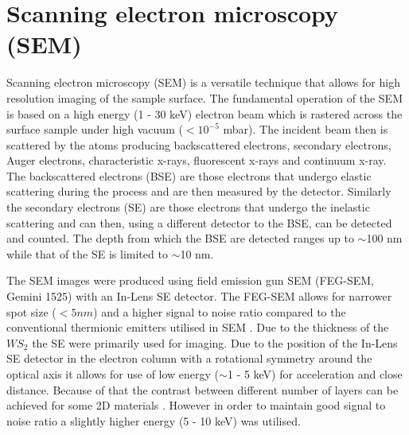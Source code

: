 \section{Scanning electron microscopy (SEM)}

Scanning electron microscopy (SEM) is a versatile technique that allows for high resolution imaging of the sample surface. The fundamental operation of the SEM is based on a high energy (1 - 30 keV) electron beam which is rastered across the surface sample under high vacuum ($<10^{-5}$ mbar). The incident beam then is scattered by the atoms producing backscattered electrons, secondary electrons, Auger electrons, characteristic x-rays, fluorescent x-rays and continuum x-ray. The backscattered electrons (BSE) are those electrons that undergo elastic scattering during the process and are then measured by the detector. Similarly the secondary electrons (SE) are those electrons that undergo the inelastic scattering and can then, using a different detector to the BSE, can be detected and counted. The depth from which the BSE are detected ranges up to $\sim$100 nm while that of the SE is limited to $\sim$10 nm.

The SEM images were produced using field emission gun SEM (FEG-SEM, Gemini 1525) with an In-Lens SE detector. The FEG-SEM allows for narrower spot size ($<5 nm$) and a higher signal to noise ratio compared to the conventional thermionic emitters utilised in SEM \cite{Ogura2009}. Due to the thickness of the $WS_2$ the SE were primarily used for imaging. Due to the position of the In-Lens SE detector in the electron column with a rotational symmetry around the optical axis it allows for use of low energy ($\sim$1 - 5 keV) for acceleration and close distance. Because of that the contrast between different number of layers can be achieved for some 2D materials \cite{Kochat2011}. However in order to maintain good signal to noise ratio a slightly higher energy (5 - 10 keV) was utilised.

